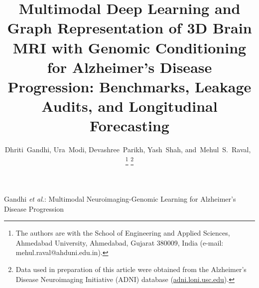 \documentclass[journal,twocolumn]{IEEEtran}
\begin{document}
\title{Multimodal Deep Learning and Graph Representation of 3D Brain MRI with Genomic Conditioning for Alzheimer's Disease Progression: Benchmarks, Leakage Audits, and Longitudinal Forecasting}

\author{Dhriti~Gandhi,
        Ura~Modi,
        Devashree~Parikh,
        Yash~Shah,
        and~Mehul~S.~Raval,~%
\thanks{The authors are with the School of Engineering and Applied Sciences, Ahmedabad University, Ahmedabad, Gujarat 380009, India (e-mail: mehul.raval@ahduni.edu.in).}%
\thanks{Data used in preparation of this article were obtained from the Alzheimer's Disease Neuroimaging Initiative (ADNI) database (\url{adni.loni.usc.edu}).}}

%
{Gandhi \MakeLowercase{\textit{et al.}}: Multimodal Neuroimaging-Genomic Learning for Alzheimer's Disease Progression}

\maketitle
\end{document}
